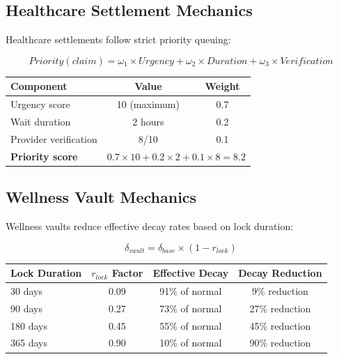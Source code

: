 \documentclass[11pt,letterpaper]{article}
\begin{document}
\subsection{Healthcare Settlement Mechanics}

Healthcare settlements follow strict priority queuing:

\begin{equation}
Priority(claim) = \omega_1 \times Urgency + \omega_2 \times Duration + \omega_3 \times Verification
\end{equation}

\clearpage


\begin{table}[H]
\centering
\begin{tabular}{lcc}
\toprule
\textbf{Component} & \textbf{Value} & \textbf{Weight} \\
\midrule
Urgency score & 10 (maximum) & 0.7 \\
Wait duration & 2 hours & 0.2 \\
Provider verification & 8/10 & 0.1 \\
\midrule
\textbf{Priority score} & \multicolumn{2}{c}{$0.7 \times 10 + 0.2 \times 2 + 0.1 \times 8 = 8.2$} \\
\bottomrule
\end{tabular}
\end{table}


\subsection{Wellness Vault Mechanics}

Wellness vaults reduce effective decay rates based on lock duration:

\begin{equation}
\delta_{vault} = \delta_{base} \times (1 - r_{lock})
\end{equation}


\begin{table}[H]
\centering
\begin{tabular}{lccc}
\toprule
\textbf{Lock Duration} & \textbf{$r_{lock}$ Factor} & \textbf{Effective Decay} & \textbf{Decay Reduction} \\
\midrule
30 days & 0.09 & 91\% of normal & 9\% reduction \\
90 days & 0.27 & 73\% of normal & 27\% reduction \\
180 days & 0.45 & 55\% of normal & 45\% reduction \\
365 days & 0.90 & 10\% of normal & 90\% reduction \\
\bottomrule
\end{tabular}
\end{table}
\end{document}
